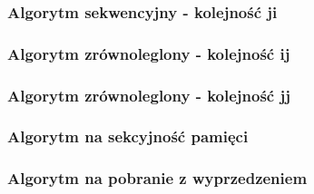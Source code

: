 \subsubsection{Algorytm sekwencyjny - kolejność ji}




\subsubsection{Algorytm zrównoleglony - kolejność ij}




\subsubsection{Algorytm zrównoleglony - kolejność jj}




\subsubsection{Algorytm na sekcyjność pamięci}




\subsubsection{Algorytm na  pobranie  z wyprzedzeniem}



